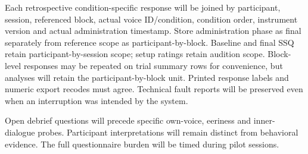 \documentclass[11pt,letterpaper]{article}
\begin{document}
Each retrospective condition-specific response will be joined by participant, session, referenced block, actual voice ID/condition, condition order, instrument version and actual administration timestamp. Store administration phase as final separately from reference scope as participant-by-block. Baseline and final SSQ retain participant-by-session scope; setup ratings retain audition scope. Block-level responses may be repeated on trial summary rows for convenience, but analyses will retain the participant-by-block unit. Printed response labels and numeric export recodes must agree. Technical fault reports will be preserved even when an interruption was intended by the system.

Open debrief questions will precede specific own-voice, eeriness and inner-dialogue probes. Participant interpretations will remain distinct from behavioral evidence. The full questionnaire burden will be timed during pilot sessions.
\end{document}
